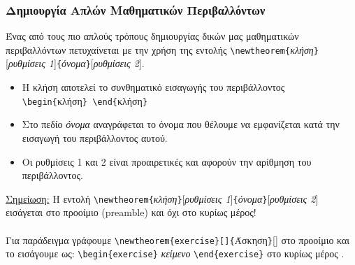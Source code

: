 \documentclass[a4paper, 12pt, oneside, xelatex, final]{article}
\begin{document}
	\subsubsection{Δημιουργία Απλών Μαθηματικών Περιβαλλόντων}	 
	 \noindent Ένας από τους πιο απλούς τρόπους δημιουργίας δικών μας μαθηματικών περιβαλλόντων πετυχαίνεται με την χρήση της εντολής \verb+\newtheorem+\verb+{+\emph{κλήση}\verb+}+[\emph{ρυθμίσεις 1}]\verb+{+\emph{όνομα}\verb+}+[\emph{ρυθμίσεις 2}].
	 \begin{itemize}
	 	\item Η κλήση αποτελεί το συνθηματικό εισαγωγής του περιβάλλοντος\\ \verb+\begin{+κλήση\verb+} \end{+κλήση\verb+}+
	 	\item Στο πεδίο \emph{όνομα} αναγράφεται το όνομα που θέλουμε να εμφανίζεται κατά την εισαγωγή του περιβάλλοντος αυτού.
		 \item Οι ρυθμίσεις 1 και 2 είναι προαιρετικές και αφορούν την αρίθμηση του περιβάλλοντος.
	 \end{itemize}
	\underline{Σημείωση:} Η εντολή  \verb+\newtheorem+\verb+{+\emph{κλήση}\verb+}+[\emph{ρυθμίσεις 1}]\verb+{+\emph{όνομα}\verb+}+[\emph{ρυθμίσεις 2}] εισάγεται στο προοίμιο (preamble) και όχι στο κυρίως μέρος!\\ \\
	  Για παράδειγμα γράφουμε \verb+\newtheorem{exercise}[]{+Άσκηση\verb+}+[] στο προοίμιο και το εισάγουμε ως: \verb+\begin{exercise}+ \emph{κείμενο} \verb+\end{exercise}+ στο κυρίως μέρος .
	
\end{document}
